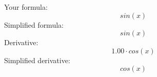 \documentclass{article}
\begin{document}
Your formula:
\begin{equation}
{sin \left( {x}\right) }
\end{equation}
Simplified formula:
\begin{equation}
{sin \left( {x}\right) }
\end{equation}
Derivative:
\begin{equation}
{{1.00}\cdot {cos \left( {x}\right) }}
\end{equation}
Simplified derivative:
\begin{equation}
{cos \left( {x}\right) }
\end{equation}
\end{document}
